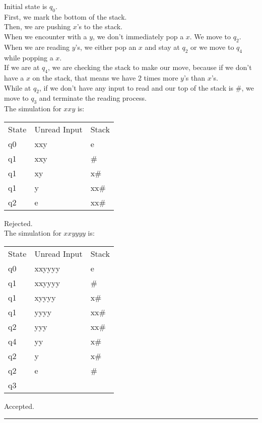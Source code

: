 \documentclass[a4paper,12pt]{article}
\newcommand{\HRule}{\rule{\linewidth}{1mm}}
\begin{document}
Initial state is $q_0$.\\
First, we mark the bottom of the stack.\\
Then, we are pushing $x$'s to the stack.\\
When we encounter with a $y$, we don't immediately pop a $x$. We move to $q_2$.\\
When we are reading $y$'s, we either pop an $x$ and stay at $q_2$ or we move to $q_4$ while popping a $x$.\\
If we are at $q_4$, we are checking the stack to make our move, because if we don't have a $x$ on the stack, that means we have 2 times more $y$'s than $x$'s.\\
While at $q_2$, if we don't have any input to read and our top of the stack is $\#$, we move to $q_3$ and terminate the reading process.\\
The simulation for $xxy$ is:
\begin{table}[H]
\centering
\begin{tabular}{lll}
State & Unread Input & Stack \\
q0    & xxy          & e     \\
q1    & xxy          & \#    \\
q1    & xy           & x\#   \\
q1    & y            & xx\#  \\
q2    & e            & xx\# 
\end{tabular}
\end{table}
Rejected.\\
The simulation for $xxyyyy$ is:\\
\begin{table}[H]
\centering
\begin{tabular}{lll}
State & Unread Input & Stack \\
q0    & xxyyyy       & e     \\
q1    & xxyyyy       & \#    \\
q1    & xyyyy        & x\#   \\
q1    & yyyy         & xx\#  \\
q2    & yyy          & xx\#  \\
q4    & yy           & x\#   \\
q2    & y            & x\#   \\
q2    & e            & \#    \\
q3    &              &      
\end{tabular}
\end{table}
Accepted.\\
\HRule\\
\end{document}
